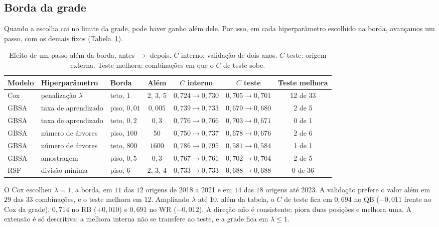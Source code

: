 \subsection{Borda da grade}
\label{subsec:apend_borda}

Quando a escolha cai no limite da grade, pode haver ganho além dele. Por isso, em cada hiperparâmetro escolhido na borda, avançamos um passo, com os demais fixos (Tabela~\ref{tab:tgb_fronteira}).

\begin{table}[H]
\centering
\caption{Efeito de um passo além da borda, antes $\rightarrow$ depois. $C$ interno: validação de dois anos. $C$ teste: origem externa. Teste melhora: combinações em que o $C$ de teste sobe.}
\label{tab:tgb_fronteira}
\thesistablesetup
\footnotesize\setlength{\tabcolsep}{2pt}
\begin{tabular*}{\textwidth}{@{\extracolsep{\fill}}lllcccc@{}}
\toprule
\textbf{Modelo} & \textbf{Hiperparâmetro} & \textbf{Borda} & \textbf{Além} & \textbf{$C$ interno} & \textbf{$C$ teste} & \textbf{Teste melhora} \\
\midrule
Cox & penalização $\lambda$ & teto, $1$ & $2$, $3$, $5$ & $0{,}724 \to 0{,}730$ & $0{,}705 \to 0{,}701$ & 12 de 33 \\
GBSA & taxa de aprendizado & piso, $0{,}01$ & $0{,}005$ & $0{,}739 \to 0{,}733$ & $0{,}679 \to 0{,}680$ & 2 de 5 \\
GBSA & taxa de aprendizado & teto, $0{,}2$ & $0{,}3$ & $0{,}776 \to 0{,}766$ & $0{,}703 \to 0{,}671$ & 0 de 1 \\
GBSA & número de árvores & piso, $100$ & $50$ & $0{,}750 \to 0{,}737$ & $0{,}678 \to 0{,}676$ & 2 de 6 \\
GBSA & número de árvores & teto, $800$ & $1600$ & $0{,}786 \to 0{,}795$ & $0{,}581 \to 0{,}584$ & 1 de 1 \\
GBSA & amostragem & piso, $0{,}5$ & $0{,}3$ & $0{,}767 \to 0{,}761$ & $0{,}702 \to 0{,}704$ & 2 de 5 \\
RSF & divisão mínima & piso, $6$ & $2$, $3$, $4$ & $0{,}733 \to 0{,}733$ & $0{,}688 \to 0{,}688$ & 0 de 36 \\
\bottomrule
\end{tabular*}
\end{table}

O Cox escolheu $\lambda = 1$, a borda, em $11$ das $12$ origens de 2018 a 2021 e em $14$ das $18$ origens até 2023. A validação prefere o valor além em $29$ das $33$ combinações, e o teste melhora em $12$. Ampliando $\lambda$ até $10$, além da tabela, o $C$ de teste fica em $0{,}694$ no QB ($-0{,}011$ frente ao Cox da grade), $0{,}714$ no RB ($+0{,}010$) e $0{,}691$ no WR ($-0{,}012$). A direção não é consistente: piora duas posições e melhora uma. A extensão é só descritiva: a melhora interna não se transfere ao teste, e a grade fica em $\lambda \le 1$.

